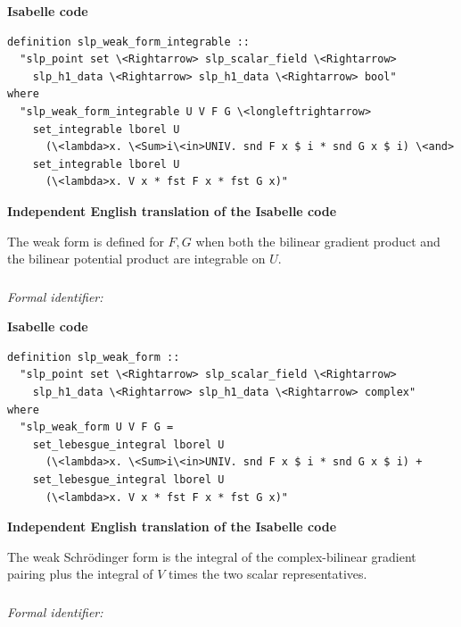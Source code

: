 \documentclass[10pt,oneside]{article}
\newcommand{\reviewlabel}[1]{\par\smallskip\noindent\textsf{\bfseries #1}\par\smallskip}
\begin{document}
\reviewlabel{Isabelle code}
\begin{lstlisting}
definition slp_weak_form_integrable ::
  "slp_point set \<Rightarrow> slp_scalar_field \<Rightarrow>
    slp_h1_data \<Rightarrow> slp_h1_data \<Rightarrow> bool"
where
  "slp_weak_form_integrable U V F G \<longleftrightarrow>
    set_integrable lborel U
      (\<lambda>x. \<Sum>i\<in>UNIV. snd F x $ i * snd G x $ i) \<and>
    set_integrable lborel U
      (\<lambda>x. V x * fst F x * fst G x)"
\end{lstlisting}

\reviewlabel{Independent English translation of the Isabelle code}
The weak form is defined for $F,G$ when both the bilinear gradient product and the bilinear potential product are integrable on $U$.

\subsubsection{\texttt{}}
\noindent\textit{Formal identifier:} \texttt{}

\reviewlabel{Isabelle code}
\begin{lstlisting}
definition slp_weak_form ::
  "slp_point set \<Rightarrow> slp_scalar_field \<Rightarrow>
    slp_h1_data \<Rightarrow> slp_h1_data \<Rightarrow> complex"
where
  "slp_weak_form U V F G =
    set_lebesgue_integral lborel U
      (\<lambda>x. \<Sum>i\<in>UNIV. snd F x $ i * snd G x $ i) +
    set_lebesgue_integral lborel U
      (\<lambda>x. V x * fst F x * fst G x)"
\end{lstlisting}

\reviewlabel{Independent English translation of the Isabelle code}
The weak Schr\"odinger form is the integral of the complex-bilinear gradient pairing plus the integral of $V$ times the two scalar representatives.

\subsubsection{\texttt{}}
\noindent\textit{Formal identifier:} \texttt{}
\end{document}
